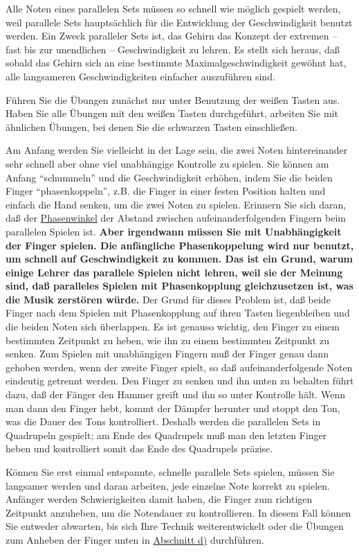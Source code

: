 Alle Noten eines parallelen Sets müssen so schnell wie möglich gespielt werden, weil parallele Sets hauptsächlich für die Entwicklung der Geschwindigkeit benutzt werden.
Ein Zweck paralleler Sets ist, das Gehirn das Konzept der extremen -- fast bis zur unendlichen -- Geschwindigkeit zu lehren.
Es stellt sich heraus, daß sobald das Gehirn sich an eine bestimmte Maximalgeschwindigkeit gewöhnt hat, alle langsameren Geschwindigkeiten einfacher auszuführen sind.

Führen Sie die Übungen zunächst nur unter Benutzung der weißen Tasten aus.
Haben Sie alle Übungen mit den weißen Tasten durchgeführt, arbeiten Sie mit ähnlichen Übungen, bei denen Sie die schwarzen Tasten einschließen.

Am Anfang werden Sie vielleicht in der Lage sein, die zwei Noten hintereinander sehr schnell aber ohne viel unabhängige Kontrolle zu spielen.
Sie können am Anfang \enquote{schummeln} und die Geschwindigkeit erhöhen, indem Sie die beiden Finger \enquote{phasenkoppeln}, z.B. die Finger in einer festen Position halten und einfach die Hand senken, um die zwei Noten zu spielen.
Erinnern Sie sich daran, daß der \hyperref[c1iv2a]{Phasenwinkel} der Abstand zwischen aufeinanderfolgenden Fingern beim parallelen Spielen ist.
\textbf{Aber irgendwann müssen Sie mit Unabhängigkeit der Finger spielen.
Die anfängliche Phasenkoppelung wird nur benutzt, um schnell auf Geschwindigkeit zu kommen.
Das ist ein Grund, warum einige Lehrer das parallele Spielen nicht lehren, weil sie der Meinung sind, daß paralleles Spielen mit Phasenkopplung gleichzusetzen ist, was die Musik zerstören würde.}
Der Grund für dieses Problem ist, daß beide Finger nach dem Spielen mit Phasenkopplung auf ihren Tasten liegenbleiben und die beiden Noten sich überlappen.
Es ist genauso wichtig, den Finger zu einem bestimmten Zeitpunkt zu heben, wie ihn zu einem bestimmten Zeitpunkt zu senken.
Zum Spielen mit unabhängigen Fingern muß der Finger genau dann gehoben werden, wenn der zweite Finger spielt, so daß aufeinanderfolgende Noten eindeutig getrennt werden.
Den Finger zu senken und ihn unten zu behalten führt dazu, daß der Fänger den Hammer greift und ihn so unter Kontrolle hält.
Wenn man dann den Finger hebt, kommt der Dämpfer herunter und stoppt den Ton, was die Dauer des Tons kontrolliert.
Deshalb werden die parallelen Sets in Quadrupeln gespielt; am Ende des Quadrupels muß man den letzten Finger heben und kontrolliert somit das Ende des Quadrupels präzise.

Können Sie erst einmal entspannte, schnelle parallele Sets spielen, müssen Sie langsamer werden und daran arbeiten, jede einzelne Note korrekt zu spielen.
Anfänger werden Schwierigkeiten damit haben, die Finger zum richtigen Zeitpunkt anzuheben, um die Notendauer zu kontrollieren.
In diesem Fall können Sie entweder abwarten, bis sich Ihre Technik weiterentwickelt oder die Übungen zum Anheben der Finger unten in \hyperref[c1iii7d]{Abschnitt d)} durchführen.



